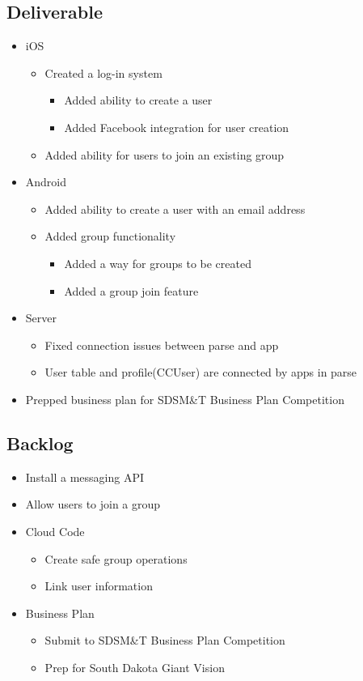 \subsection{Deliverable}
\begin{itemize}
	\item iOS
	\begin{itemize}
		\item Created a log-in system
		\begin{itemize}
			\item Added ability to create a user
			\item Added Facebook integration for user creation
		\end{itemize}
		\item Added ability for users to join an existing group
	\end{itemize}
	\item Android
	\begin{itemize}
		\item Added ability to create a user with an email address
		\item Added group functionality
		\begin{itemize}
			\item Added a way for groups to be created
			\item Added a group join feature
		\end{itemize}		
	\end{itemize}
	\item Server
	\begin{itemize}
		\item Fixed connection issues between parse and app
		\item User table and profile(CCUser) are connected by apps in parse
	\end{itemize}
	\item Prepped business plan for SDSM\&T Business Plan Competition
\end{itemize}
\subsection{Backlog}
\begin{itemize}
	\item Install a messaging API
	\item Allow users to join a group
	\item Cloud Code
	\begin{itemize}
		\item Create safe group operations
		\item Link user information
	\end{itemize}
	\item Business Plan
	\begin{itemize}
		\item Submit to SDSM\&T Business Plan Competition
		\item Prep for South Dakota Giant Vision
	\end{itemize}
\end{itemize}
